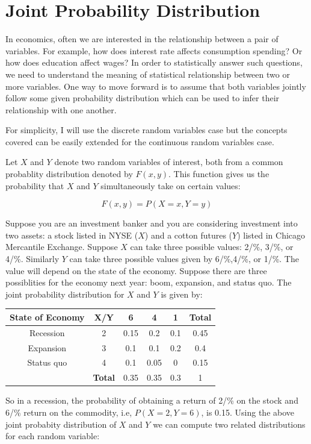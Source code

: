 \documentclass[]{book}
\theoremstyle{definition}
\theoremstyle{definition}
\theoremstyle{definition}
\theoremstyle{remark}
\let\BeginKnitrBlock\begin \let\EndKnitrBlock\end
\begin{document}
\hypertarget{joint-probability-distribution}{%
\section{Joint Probability Distribution}\label{joint-probability-distribution}}

In economics, often we are interested in the relationship between a pair of variables. For example, how does interest rate affects consumption spending? Or how does education affect wages? In order to statistically answer such questions, we need to understand the meaning of statistical relationship between two or more variables. One way to move forward is to assume that both variables jointly follow some given probability distribution which can be used to infer their relationship with one another.

For simplicity, I will use the discrete random variables case but the concepts covered can be easily extended for the continuous random variables case.

Let \(X\) and \(Y\) denote two random variables of interest, both from a common probablity distribution denoted by \(F(x,y)\). This function gives us the probability that \(X\) and \(Y\) simultaneously take on certain values:

\[F(x,y)=P(X=x, Y=y)\]

\BeginKnitrBlock{example}
\protect\hypertarget{exm:unnamed-chunk-59}{}{\label{exm:unnamed-chunk-59} }
Suppose you are an investment banker and you are considering investment into two assets: a stock listed in NYSE (\(X\)) and a cotton futures (\(Y\)) listed in Chicago Mercantile Exchange. Suppose \(X\) can take three possible values: 2/\%, 3/\%, or 4/\%. Similarly \(Y\) can take three possible values given by 6/\%,4/\%, or 1/\%. The value will depend on the state of the economy. Suppose there are three possiblities for the economy next year: boom, expansion, and status quo. The joint probability distribution for \(X\) and \(Y\) is given by:

\begin{longtable}[]{@{}cccccc@{}}
\toprule
State of Economy & X/Y & 6 & 4 & 1 & Total\tabularnewline
\midrule
\endhead
Recession & 2 & 0.15 & 0.2 & 0.1 & 0.45\tabularnewline
Expansion & 3 & 0.1 & 0.1 & 0.2 & 0.4\tabularnewline
Status quo & 4 & 0.1 & 0.05 & 0 & 0.15\tabularnewline
& \textbf{Total} & 0.35 & 0.35 & 0.3 & 1\tabularnewline
\bottomrule
\end{longtable}
\EndKnitrBlock{example}

So in a recession, the probability of obtaining a return of 2/\% on the stock and 6/\% return on the commodity, i.e, \(P(X=2,Y=6)\), is 0.15.
Using the above joint probabity distribution of \(X\) and \(Y\) we can compute two related distributions for each random variable:
\end{document}
